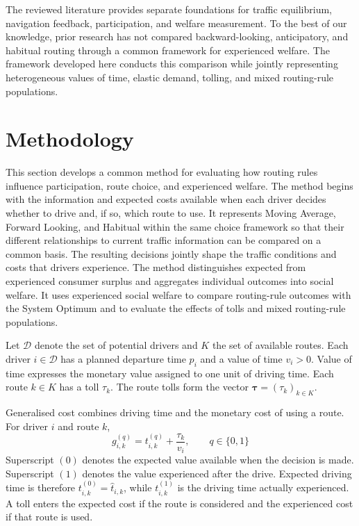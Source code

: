 \documentclass{article}
\begin{document}
The reviewed literature provides separate foundations for traffic equilibrium, navigation feedback, participation, and welfare measurement. To the best of our knowledge, prior research has not compared backward-looking, anticipatory, and habitual routing through a common framework for experienced welfare. The framework developed here conducts this comparison while jointly representing heterogeneous values of time, elastic demand, tolling, and mixed routing-rule populations.

\clearpage
\section{Methodology}

This section develops a common method for evaluating how routing rules influence participation, route choice, and experienced welfare. The method begins with the information and expected costs available when each driver decides whether to drive and, if so, which route to use. It represents Moving Average, Forward Looking, and Habitual within the same choice framework so that their different relationships to current traffic information can be compared on a common basis. The resulting decisions jointly shape the traffic conditions and costs that drivers experience. The method distinguishes expected from experienced consumer surplus and aggregates individual outcomes into social welfare. It uses experienced social welfare to compare routing-rule outcomes with the System Optimum and to evaluate the effects of tolls and mixed routing-rule populations.

Let $\mathcal D$ denote the set of potential drivers and $K$ the set of available routes. Each driver $i\in\mathcal D$ has a planned departure time $p_i$ and a value of time $v_i>0$. Value of time expresses the monetary value assigned to one unit of driving time. Each route $k\in K$ has a toll $\tau_k$. The route tolls form the vector $\boldsymbol{\tau}=(\tau_k)_{k\in K}$.

Generalised cost combines driving time and the monetary cost of using a route. For driver $i$ and route $k$,
\[
g_{i,k}^{(q)}
=
t_{i,k}^{(q)}
+
\frac{\tau_k}{v_i},
\qquad
q\in\{0,1\}
\]
Superscript $(0)$ denotes the expected value available when the decision is made. Superscript $(1)$ denotes the value experienced after the drive. Expected driving time is therefore $t_{i,k}^{(0)}=\hat t_{i,k}$, while $t_{i,k}^{(1)}$ is the driving time actually experienced. A toll enters the expected cost if the route is considered and the experienced cost if that route is used.
\end{document}
